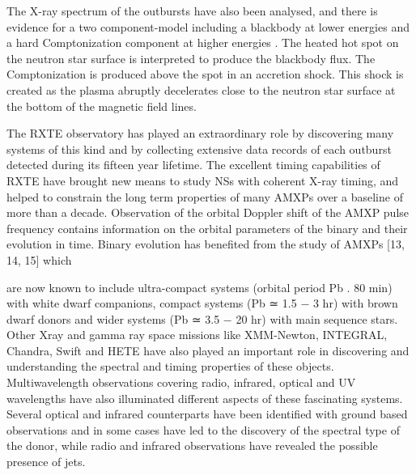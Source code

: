 \documentclass{wihuri}
\begin{document}



The X-ray spectrum of the outbursts have also been analysed, and there is evidence for a two component-model including a blackbody at lower energies and a hard Comptonization component at higher energies \cite{twocompmod} %
. The heated hot spot on the neutron star surface is interpreted to produce the blackbody flux. The Comptonization is produced above the spot in an accretion shock. This shock is created as the plasma abruptly decelerates close to the neutron star surface at the bottom of the magnetic field lines.



\iffalse

The RXTE observatory has played an extraordinary role by discovering many
systems of this kind and by collecting extensive data records of each outburst detected
during its fifteen year lifetime. The excellent timing capabilities of RXTE
have brought new means to study NSs with coherent X-ray timing, and helped to
constrain the long term properties of many AMXPs over a baseline of more than
a decade. Observation of the orbital Doppler shift of the AMXP pulse frequency
contains information on the orbital parameters of the binary and their evolution in
time. Binary evolution has benefited from the study of AMXPs [13, 14, 15] which

are now known to include ultra-compact systems (orbital period Pb . 80 min) with
white dwarf companions, compact systems (Pb ≃ 1.5 − 3 hr) with brown dwarf
donors and wider systems (Pb ≃ 3.5 − 20 hr) with main sequence stars. Other Xray
and gamma ray space missions like XMM-Newton, INTEGRAL, Chandra, Swift
and HETE have also played an important role in discovering and understanding the
spectral and timing properties of these objects. Multiwavelength observations covering
radio, infrared, optical and UV wavelengths have also illuminated different
aspects of these fascinating systems. Several optical and infrared counterparts have
been identified with ground based observations and in some cases have led to the
discovery of the spectral type of the donor, while radio and infrared observations
have revealed the possible presence of jets.
\end{document}
